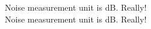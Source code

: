 \documentclass{book}
\begin{document}
\noindent
Noise measurement unit is dB. Really!\\
Noise measurement unit is dB\@. Really!
\end{document}
